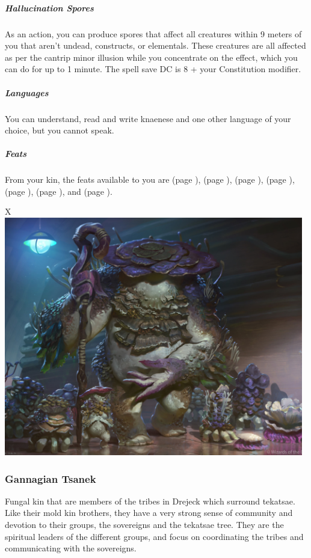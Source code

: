     \subparagraph{Hallucination Spores} As an action, you can produce spores that affect all creatures within 9 meters of you that aren't undead, constructs, or elementals.
    These creatures are all affected as per the cantrip minor illusion while you concentrate on the effect, which you can do for up to 1 minute.
    The spell save DC is 8 + your Constitution modifier.

    \subparagraph{Languages} You can understand, read and write knaenese and one other language of your choice, but you cannot speak.

    \subparagraph{Feats} From your kin, the feats available to you are
    \textbf{} (page \pageref{feat::}),
    \textbf{} (page \pageref{feat::}),
    \textbf{} (page \pageref{feat::}),
    \textbf{} (page \pageref{feat::}),
    \textbf{} (page \pageref{feat::}),
    \textbf{} (page \pageref{feat::}), and
    \textbf{} (page \pageref{feat::}).

\begin{table}[b]%
    \begin{DndTable}[width=\linewidth]{X}
        \includegraphics[width=0.98\textwidth]{04kins/img/16tsanek_sovereign.jpg}
    \end{DndTable}
\end{table}

\subsubsection{Gannagian Tsanek}
    Fungal kin that are members of the tribes in Drejeck which surround tekatsae.
    Like their mold kin brothers, they have a very strong sense of community and devotion to their groups, the sovereigns and the tekatsae tree.
    They are the spiritual leaders of the different groups, and focus on coordinating the tribes and communicating with the sovereigns.

